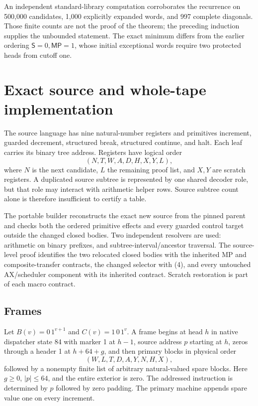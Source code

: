 \documentclass[11pt]{article}
\newcommand{\MP}{\mathsf{MP}}
\newcommand{\SSS}{\mathsf S}
\begin{document}
An independent standard-library computation corroborates the recurrence on 500,000 candidates, 1,000 explicitly expanded words, and 997 complete diagonals. Those finite counts are not the proof of the theorem; the preceding induction supplies the unbounded statement. The exact minimum differs from the earlier ordering $\SSS=0,\MP=1$, whose initial exceptional words require two protected heads from cutoff one.

\section{Exact source and whole-tape implementation}
\label{sec:physical}

The source language has nine natural-number registers and primitives increment, guarded decrement, structured break, structured continue, and halt. Each leaf carries its binary tree address. Registers have logical order
\[
 (N,T,W,A,D,H,X,Y,L),
\]
where $N$ is the next candidate, $L$ the remaining proof list, and $X,Y$ are scratch registers. A duplicated source subtree is represented by one shared decoder role, but that role may interact with arithmetic helper rows. Source subtree count alone is therefore insufficient to certify a table.

The portable builder reconstructs the exact new source from the pinned parent and checks both the ordered primitive effects and every guarded control target outside the changed closed bodies. Two independent resolvers are used: arithmetic on binary prefixes, and subtree-interval/ancestor traversal. The source-level proof identifies the two relocated closed bodies with the inherited MP and composite-transfer contracts, the changed selector with (4), and every untouched AX/scheduler component with its inherited contract. Scratch restoration is part of each macro contract.

\subsection{Frames}

Let $B(v)=0\,1^{v+1}$ and $C(v)=1\,0\,1^v$. A frame begins at head $h$ in native dispatcher state 84 with marker 1 at $h-1$, source address $p$ starting at $h$, zeros through a header 1 at $h+64+g$, and then primary blocks in physical order
\[
 (W,L,T,D,A,Y,N,H,X),
\]
followed by a nonempty finite list of arbitrary natural-valued spare blocks. Here $g\ge0$, $|p|\le64$, and the entire exterior is zero. The addressed instruction is determined by $p$ followed by zero padding. The primary machine appends spare value one on every increment.
\end{document}
